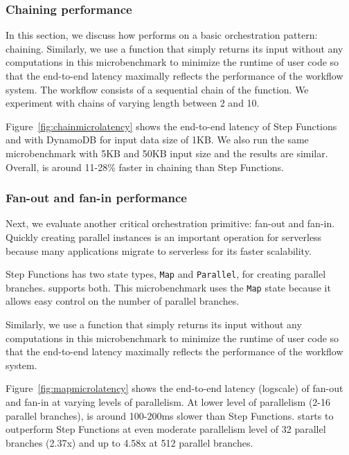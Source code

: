 \subsubsection{Chaining performance}

In this section, we discuss how \name{} performs on a basic orchestration
pattern: chaining. Similarly, we use a function that simply returns its input
without any computations in this microbenchmark to minimize the runtime of
user code so that the end-to-end latency maximally reflects the performance of
the workflow system. The workflow consists of a sequential chain of the
function. We experiment with chains of varying length between 2 and 10.

Figure~\ref{fig:chainmicrolatency} shows the end-to-end latency of Step
Functions and \name{} with DynamoDB for input data size of 1KB. We also run
the same microbenchmark with 5KB and 50KB input size and the results are
similar. Overall, \name{} is around 11-28\% faster in chaining than Step
Functions.

\subsubsection{Fan-out and fan-in performance}\label{sec:eval-fan-out}

Next, we evaluate another critical orchestration primitive: fan-out and
fan-in. Quickly creating parallel instances is an important operation for
serverless because many applications migrate to serverless for its faster
scalability.

Step Functions has two state types, \texttt{Map} and \texttt{Parallel}, for creating
parallel branches. \name{} supports both. This microbenchmark uses the
\texttt{Map} state because it allows easy control on the number of parallel
branches.

Similarly, we use a function that simply returns its input without any
computations in this microbenchmark to minimize the runtime of user code so
that the end-to-end latency maximally reflects the performance of the workflow
system.

Figure~\ref{fig:mapmicrolatency} shows the end-to-end latency (logscale) of
fan-out and fan-in at varying levels of parallelism. At lower level of
parallelism (2-16 parallel branches), \name{} is around 100-200ms slower than
Step Functions. \name{} starts to outperform Step Functions at even moderate parallelism level of 32
parallel branches (2.37x) and up to 4.58x at 512 parallel branches.

